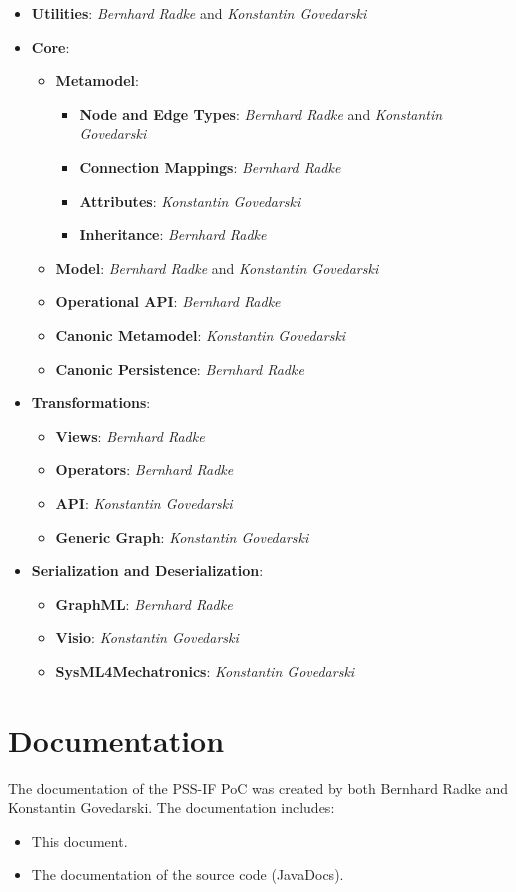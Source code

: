 \begin{itemize}
\item \textbf{Utilities}: \textit{Bernhard Radke} and \textit{Konstantin Govedarski}
\item \textbf{Core}:
	\begin{itemize}
	\item \textbf{Metamodel}:
		\begin{itemize}
		\item \textbf{Node and Edge Types}: \textit{Bernhard Radke} and \textit{Konstantin Govedarski}
		\item \textbf{Connection Mappings}: \textit{Bernhard Radke}
		\item \textbf{Attributes}: \textit{Konstantin Govedarski}
		\item \textbf{Inheritance}: \textit{Bernhard Radke}
		\end{itemize}
	\item \textbf{Model}: \textit{Bernhard Radke} and \textit{Konstantin Govedarski}
	\item \textbf{Operational API}: \textit{Bernhard Radke}
	\item \textbf{Canonic Metamodel}: \textit{Konstantin Govedarski}
	\item \textbf{Canonic Persistence}: \textit{Bernhard Radke}
 	\end{itemize}
\item \textbf{Transformations}:
	\begin{itemize}
	\item \textbf{Views}: \textit{Bernhard Radke}
	\item \textbf{Operators}: \textit{Bernhard Radke}
	\item \textbf{API}: \textit{Konstantin Govedarski}
	\item \textbf{Generic Graph}: \textit{Konstantin Govedarski}
	\end{itemize}
\item \textbf{Serialization and Deserialization}:
	\begin{itemize}
	\item \textbf{GraphML}: \textit{Bernhard Radke}
	\item \textbf{Visio}: \textit{Konstantin Govedarski}
	\item \textbf{SysML4Mechatronics}: \textit{Konstantin Govedarski}
	\end{itemize}
\end{itemize}

\section*{Documentation}

The documentation of the PSS-IF PoC was created by both Bernhard Radke and Konstantin Govedarski. The documentation includes:

\begin{itemize}
\item This document.
\item The documentation of the source code (JavaDocs).
\end{itemize}